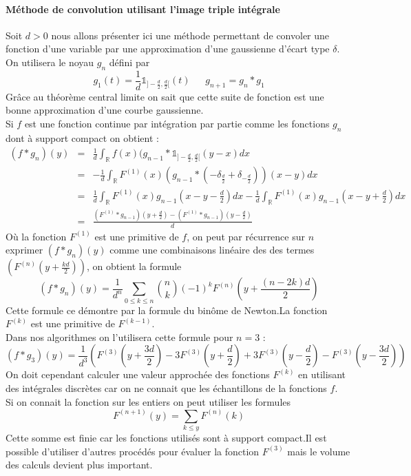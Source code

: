 \paragraph{Méthode de convolution utilisant l'image  triple intégrale}
Soit $d>0$ nous allons présenter ici une méthode permettant de convoler une fonction d'une variable par une approximation d'une gaussienne d'écart type $\delta$.\\
On utilisera le noyau $g_n$ défini par 
\begin{equation*}
g_1(t)=\frac{1}{d}\mathds{1}_{]-\frac{d}{2},\frac{d}{2}[}(t) ~~~~~~~g_{n+1}= g_n * g_1
\end{equation*}
Grâce au théorème central limite on sait que cette suite de fonction est une bonne approximation d'une courbe gaussienne.\\
Si $f$ est une fonction continue par intégration par partie comme les fonctions $g_n$ dont à support compact on obtient  :
\begin{eqnarray*}
(f * g_n )(y)&=&\frac{1}{d} \int_{\mathbb{R}} f(x)(g_{n-1} * \mathds{1}_{]-\frac{d}{2},\frac{d}{2}[}(y-x) dx\\
                 &=& -\frac{1}{d} \int_{\mathbb{R}} F^{(1)}(x)(g_{n-1} * (-\delta_{\frac{d}{2}}+\delta_{-\frac{d}{2}}))(x-y) dx\\
                 &=& \frac{1}{d} \int_{\mathbb{R}} F^{(1)}(x)g_{n-1}(x-y-\frac{d}{2} )dx -\frac{1}{d} \int_{\mathbb{R}} F^{(1)}(x)g_{n-1}\left(x-y+\frac{d}{2}\right)dx\\
                 &=& \frac{(F^{(1)} * g_{n-1} )\left(y+\frac{d}{2}\right)-(F^{(1)} * g_{n-1} )\left(y-\frac{d}{2}\right)}{d}
\end{eqnarray*}
Où la fonction $F^{(1)}$ est une primitive de $f$, on peut par récurrence sur $n$ exprimer $(f*g_{n})(y)$ comme une combinaisons linéaire des des termes $\left(F^{(n)}\left(y+\frac{kd}{2}\right)\right)$, on obtient la formule
\begin{equation*}
(f*g_n)(y)=\frac{1}{d^n}\underset{0 \le k\le n}{\sum} \binom{n}{k}(-1)^{k} F^{(n)}(y+\frac{(n-2k)d}{2})
\end{equation*}
Cette formule ce démontre par la formule du binôme de Newton.La fonction $F^{(k)}$ est une primitive de $F^{(k-1)}$.\\
Dans nos algorithmes  on l'utilisera cette formule pour $n=3$ :
\begin{equation*}
(f*g_3)(y)=\frac{1}{d^3}(F^{(3)}(y+\frac{3d}{2})-3F^{(3)}(y+\frac{d}{2})+3F^{(3)}(y-\frac{d}{2})-F^{(3)}(y-\frac{3d}{2}))
\end{equation*}
On doit cependant calculer une valeur approchée des fonctions $F^{(k)}$ en utilisant des intégrales discrètes car on ne connait que les échantillons de la fonctions $f$.\\
Si on connait la fonction sur les entiers on peut utiliser les formules
\begin{equation*}
F^{(n+1)}(y)=\underset{k\le y}{\sum}F^{(n)}(k)
\end{equation*}
Cette somme est finie car les fonctions utilisés sont à support compact.Il est possible d'utiliser d'autres procédés pour évaluer la fonction $F^{(3)}$ mais le volume des calculs devient plus important.\\

